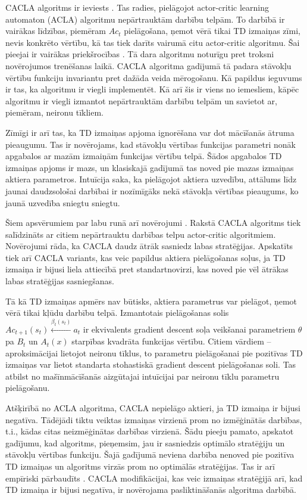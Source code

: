 \documentclass{ludis} %
\begin{document}
CACLA algoritms ir ieviests \autocite{Hasselt2007}. Tas radies, pielāgojot actor-critic learning automaton (ACLA) algoritmu nepārtrauktām darbību telpām.
To darbībā ir vairākas līdzības, piemēram $Ac_t$ pielāgošana, ņemot vērā tikai TD izmaiņas zīmi, nevis konkrēto vērtību, kā tas tiek darīts vairumā citu actor-critic algoritmu.
Šai pieejai ir vairākas priekšrocības \autocite{Hasselt2007}.
Tā dara algoritmu noturīgu pret troksni novērojumos trenēšanas laikā.
CACLA algoritma gadījumā tā padara stāvokļu vērtību funkciju invariantu pret dažāda veida mērogošanu.
Kā papildus ieguvums ir tas, ka algoritmu ir viegli implementēt.
Kā arī šis ir viens no iemesliem, kāpēc algoritmu ir viegli izmantot nepārtrauktām darbību telpām un savietot ar, piemēram, neironu tīkliem.

Zīmīgi ir arī tas, ka TD izmaiņas apjoma ignorēšana var dot mācīšanās ātruma pieaugumu.
Tas ir novērojams, kad stāvokļu vērtības funkcijas parametri nonāk apgabalos ar mazām izmaiņām funkcijas vērtību telpā.
Šādos apgabalos TD izmaiņas apjoms ir mazs, un klasiskajā gadījumā tas noved pie mazas izmaiņas aktiera parametros.
Intuīcija saka, ka pielāgojot aktiera uzvedību, attālums līdz jaunai daudzsološai darbībai ir nozīmīgāks nekā stāvokļa vērtības pieaugums, ko jaunā uzvedība sniegtu sniegtu.

Šiem apsvērumiem par labu runā arī novērojumi \autocite{Hasselt2007}.
Rakstā CACLA algoritms tiek salīdzināts ar citiem nepārtrauktu darbības telpu actor-critic algoritmiem.
Novērojumi rāda, ka CACLA daudz ātrāk sasniedz labas stratēģijas.
Apskatīts tiek arī CACLA variants, kas veic papildus aktiera pielāgošanas soļus, ja TD izmaiņa ir bijusi liela attiecībā pret standartnovirzi, kas noved pie vēl ātrākas labas stratēģijas sasniegšanas.

Tā kā TD izmaiņas apmērs nav būtisks, aktiera parametrus var pielāgot, ņemot vērā tikai kļūdu darbību telpā.
Izmantotais pielāgošanas solis $Ac_{t+1}(s_t) \xleftarrow{\beta_t(s_t)} a_t$ ir ekvivalents gradient descent soļa veikšanai parametriem $\theta$ pa $B_t$ un $A_t(x)$ starpības kvadrāta funkcijas vērtību.
Citiem vārdiem -- aproksimācijai lietojot neironu tīklus, to parametru pielāgošanai pie pozitīvas TD izmaiņas var lietot standarta stohastiskā gradient descent pielāgošanas soli.
Tas atbilst no mašīnmācīšanās aizgūtajai intuīcijai par neironu tīklu parametru pielāgošanu.

Atšķirībā no ACLA algoritma, CACLA nepielāgo aktieri, ja TD izmaiņa ir bijusi negatīva. Tādējādi tiktu veiktas izmaiņas virzienā prom no izmēģinātās darbības, t.i., kādas citas neizmēģinātas darbības virzienā.
Šādu pieeju pamato, apskatot gadījumu, kad algoritms, pieņemsim, jau ir sasniedzis optimālo stratēģiju un stāvokļu vērtības funkciju.
Šajā gadījumā neviena darbība nenoved pie pozitīva TD izmaiņas un algoritms virzās prom no optimālās stratēģijas.
Tas ir arī empīriski pārbaudīts \autocite{Hasselt2007}.
CACLA modifikācijai, kas veic izmaiņas stratēģijā arī, kad TD izmaiņa ir bijusi negatīva, ir novērojama pasliktināšanās algoritma darbībā.
\end{document}
